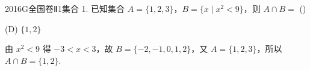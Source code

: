 
\begin{problem}{2016}{G}{全国卷Ⅱ}{1}{集合}
1. 已知集合 $ A = \{1,2,3\} $，$ B = \{x \mid x^2 < 9\} $，则 $ A \cap B = $ (\hspace{1cm})
\begin{choices}
\end{choices}
\end{problem}

\begin{answer}
(D) $\{1,2\}$
\end{answer}

\begin{solutions}
由 $ x^2 < 9 $ 得 $ -3 < x < 3 $，故 $ B = \{-2,-1,0,1,2\} $，又 $ A = \{1,2,3\} $，所以 $ A \cap B = \{1,2\} $.
\end{solutions}